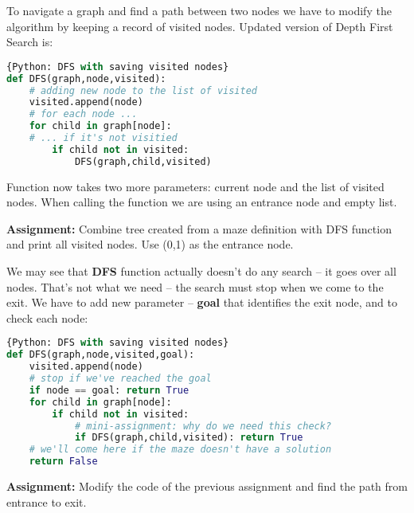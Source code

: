 To navigate a graph and find a path between two nodes we
have to modify the algorithm by keeping a record of visited
nodes. Updated version of Depth First Search is:

\begin{lstlisting}[language=Python,style=codelst]{Python: DFS with saving visited nodes}
def DFS(graph,node,visited):
    # adding new node to the list of visited
    visited.append(node)
    # for each node ...
    for child in graph[node]:
    # ... if it's not visitied
        if child not in visited:
            DFS(graph,child,visited)
\end{lstlisting}

Function now takes two more parameters: current node and the list
of visited nodes. When calling the function we are using
an entrance node and empty list.

\begin{tcolorbox}
\textbf{Assignment:}
Combine tree created from a maze definition with DFS function and
print all visited nodes. Use (0,1) as the entrance node.
\end{tcolorbox}

We may see that \textbf{DFS} function actually doesn't do any search --
it goes over all nodes. That's not what we need -- the search must
stop when we come to the exit. We have to add new parameter -- \textbf{goal}
that identifies the exit node, and to check each node:

\begin{lstlisting}[language=Python,style=codelst]{Python: DFS with saving visited nodes}
def DFS(graph,node,visited,goal):
    visited.append(node)
    # stop if we've reached the goal
    if node == goal: return True
    for child in graph[node]:
        if child not in visited:
            # mini-assignment: why do we need this check?
            if DFS(graph,child,visited): return True
    # we'll come here if the maze doesn't have a solution
    return False
\end{lstlisting}


\begin{tcolorbox}
\textbf{Assignment:}
Modify the code of the previous assignment and find the path from
entrance to exit.
\end{tcolorbox}






